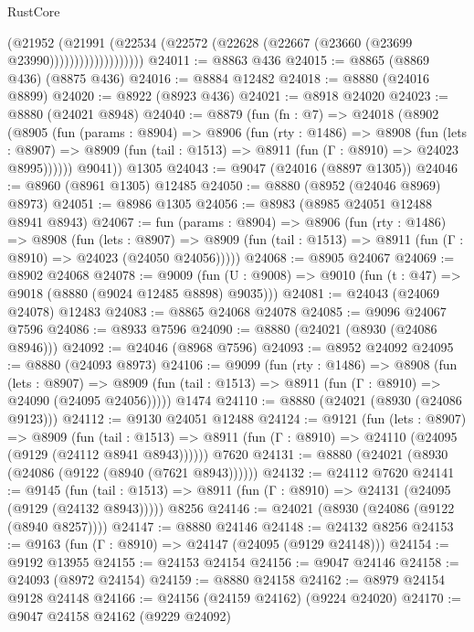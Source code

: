 \begin{lexlean}{RustCore}
\begin{coremodule}
                          (@21952
                            (@21991
                              (@22534
                                (@22572 (@22628 (@22667 (@23660 (@23699 @23990)))))))))))))))))))
@24011 := @8863 @436
@24015 := @8865 (@8869 @436) (@8875 @436)
@24016 := @8884 @12482
@24018 := @8880 (@24016 @8899)
@24020 := @8922 (@8923 @436)
@24021 := @8918 @24020
@24023 := @8880 (@24021 @8948)
@24040 := @8879
    (fun (fn : @7) =>
    @24018
      (@8902
        (@8905
          (fun (params : @8904) =>
          @8906
            (fun (rty : @1486) =>
            @8908
              (fun (lets : @8907) =>
              @8909 (fun (tail : @1513) => @8911 (fun (Γ : @8910) => @24023 @8995))))))
        @9041))
    @1305
@24043 := @9047 (@24016 (@8897 @1305))
@24046 := @8960 (@8961 @1305) @12485
@24050 := @8880 (@8952 (@24046 @8969) @8973)
@24051 := @8986 @1305
@24056 := @8983 (@8985 @24051 @12488 @8941 @8943)
@24067 := fun (params : @8904) =>
  @8906
    (fun (rty : @1486) =>
    @8908
      (fun (lets : @8907) =>
      @8909 (fun (tail : @1513) => @8911 (fun (Γ : @8910) => @24023 (@24050 @24056)))))
@24068 := @8905 @24067
@24069 := @8902 @24068
@24078 := @9009
    (fun (U : @9008) => @9010 (fun (t : @47) => @9018 (@8880 (@9024 @12485 @8898) @9035)))
@24081 := @24043 (@24069 @24078) @12483
@24083 := @8865 @24068 @24078
@24085 := @9096 @24067 @7596
@24086 := @8933 @7596
@24090 := @8880 (@24021 (@8930 (@24086 @8946)))
@24092 := @24046 (@8968 @7596)
@24093 := @8952 @24092
@24095 := @8880 (@24093 @8973)
@24106 := @9099
    (fun (rty : @1486) =>
    @8908
      (fun (lets : @8907) =>
      @8909 (fun (tail : @1513) => @8911 (fun (Γ : @8910) => @24090 (@24095 @24056)))))
    @1474
@24110 := @8880 (@24021 (@8930 (@24086 @9123)))
@24112 := @9130 @24051 @12488
@24124 := @9121
    (fun (lets : @8907) =>
    @8909
      (fun (tail : @1513) =>
      @8911 (fun (Γ : @8910) => @24110 (@24095 (@9129 (@24112 @8941 @8943))))))
    @7620
@24131 := @8880 (@24021 (@8930 (@24086 (@9122 (@8940 (@7621 @8943))))))
@24132 := @24112 @7620
@24141 := @9145
    (fun (tail : @1513) => @8911 (fun (Γ : @8910) => @24131 (@24095 (@9129 (@24132 @8943)))))
    @8256
@24146 := @24021 (@8930 (@24086 (@9122 (@8940 @8257))))
@24147 := @8880 @24146
@24148 := @24132 @8256
@24153 := @9163 (fun (Γ : @8910) => @24147 (@24095 (@9129 @24148)))
@24154 := @9192 @13955
@24155 := @24153 @24154
@24156 := @9047 @24146
@24158 := @24093 (@8972 @24154)
@24159 := @8880 @24158
@24162 := @8979 @24154 @9128 @24148
@24166 := @24156 (@24159 @24162) (@9224 @24020)
@24170 := @9047 @24158 @24162 (@9229 @24092)

\end{coremodule}
\end{lexlean}
